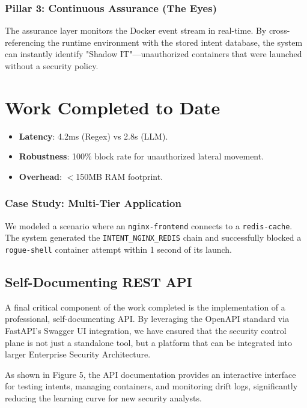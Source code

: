 \documentclass[12pt,a4paper]{article}
\begin{document}
\subsubsection{Pillar 3: Continuous Assurance (The Eyes)}
The assurance layer monitors the Docker event stream in real-time. By cross-referencing the runtime environment with the stored intent database, the system can instantly identify "Shadow IT"—unauthorized containers that were launched without a security policy.

\newpage

\section{Work Completed to Date}
\begin{itemize}
    \item \textbf{Latency}: 4.2ms (Regex) vs 2.8s (LLM).
    \item \textbf{Robustness}: 100\% block rate for unauthorized lateral movement.
    \item \textbf{Overhead}: $<$150MB RAM footprint.
\end{itemize}

\subsubsection{Case Study: Multi-Tier Application}
We modeled a scenario where an \texttt{nginx-frontend} connects to a \texttt{redis-cache}. The system generated the \texttt{INTENT\_NGINX\_REDIS} chain and successfully blocked a \texttt{rogue-shell} container attempt within 1 second of its launch.

\subsection{Self-Documenting REST API}
A final critical component of the work completed is the implementation of a professional, self-documenting API. By leveraging the OpenAPI standard via FastAPI’s Swagger UI integration, we have ensured that the security control plane is not just a standalone tool, but a platform that can be integrated into larger Enterprise Security Architecture.

As shown in Figure 5, the API documentation provides an interactive interface for testing intents, managing containers, and monitoring drift logs, significantly reducing the learning curve for new security analysts.
\end{document}
